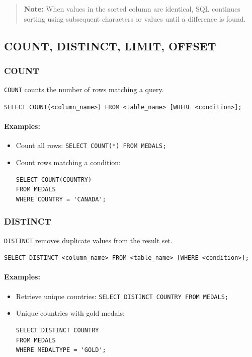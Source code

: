 \documentclass{article}
\begin{document}
\begin{quote}
\textbf{Note:} When values in the sorted column are identical, SQL continues sorting using subsequent characters or values until a difference is found.
\end{quote}


\subsection{COUNT, DISTINCT, LIMIT, OFFSET}

\subsubsection{COUNT}
\texttt{COUNT} counts the number of rows matching a query.

\begin{FormulaBox}
\texttt{SELECT COUNT(<column\_name>) FROM <table\_name> [WHERE <condition>];}
\end{FormulaBox}

\paragraph{Examples:}
\begin{itemize}
    \item Count all rows: \texttt{SELECT COUNT(*) FROM MEDALS;}
    \item Count rows matching a condition: 
\begin{verbatim}
SELECT COUNT(COUNTRY) 
FROM MEDALS 
WHERE COUNTRY = 'CANADA';
\end{verbatim}
\end{itemize}

\subsubsection{DISTINCT}
\texttt{DISTINCT} removes duplicate values from the result set.

\begin{FormulaBox}
\texttt{SELECT DISTINCT <column\_name> FROM <table\_name> [WHERE <condition>];}
\end{FormulaBox}

\paragraph{Examples:}
\begin{itemize}
    \item Retrieve unique countries: \texttt{SELECT DISTINCT COUNTRY FROM MEDALS;}
    \item Unique countries with gold medals: 
\begin{verbatim}
SELECT DISTINCT COUNTRY 
FROM MEDALS 
WHERE MEDALTYPE = 'GOLD';
\end{verbatim}
\end{itemize}
\end{document}
